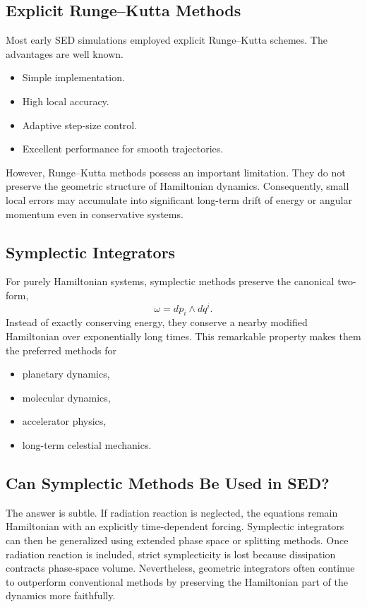\subsection{Explicit Runge--Kutta Methods}
Most early SED simulations employed explicit Runge--Kutta schemes.
The advantages are well known.
\begin{itemize}
\item
Simple implementation.
\item
High local accuracy.
\item
Adaptive step-size control.
\item
Excellent performance for smooth trajectories.
\end{itemize}
However,
Runge--Kutta methods possess an important limitation.
They do not preserve the geometric structure of Hamiltonian dynamics.
Consequently,
small local errors may accumulate into significant long-term drift of
energy or angular momentum even in conservative systems.
\subsection{Symplectic Integrators}
For purely Hamiltonian systems,
symplectic methods preserve the canonical two-form,
\[\omega=dp_i\wedge dq^i.\]
Instead of exactly conserving energy,
they conserve a nearby modified Hamiltonian over exponentially long
times.
This remarkable property makes them the preferred methods for
\begin{itemize}
\item
planetary dynamics,
\item
molecular dynamics,
\item
accelerator physics,
\item
long-term celestial mechanics.
\end{itemize}
\subsection{Can Symplectic Methods Be Used in SED?}
The answer is subtle.
If radiation reaction is neglected,
the equations remain Hamiltonian with an explicitly time-dependent
forcing.
Symplectic integrators can then be generalized using extended phase
space or splitting methods.
Once radiation reaction is included,
strict symplecticity is lost because dissipation contracts phase-space
volume.
Nevertheless,
geometric integrators often continue to outperform conventional methods
by preserving the Hamiltonian part of the dynamics more faithfully.

